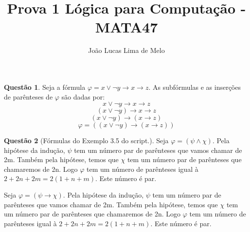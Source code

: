 \documentclass[tikz,border=5]{article}
\title{Prova 1 Lógica para Computação - MATA47}
\author{João Lucas Lima de Melo}
\theoremstyle{definition}
\newtheorem{exerc}{Questão}
\begin{document}
	\maketitle
	\begin{exerc} Seja a fórmula $\varphi = x \vee \neg y \rightarrow x \rightarrow z$. As subfórmulas e as inserções de parênteses de $\varphi$ são dadas por:
	    \begin{displaymath}
	        x \vee \neg y \rightarrow x \rightarrow z
	    \end{displaymath}
	    \begin{displaymath}
	        (x \vee \neg y) \rightarrow x \rightarrow z
	    \end{displaymath}
	    \begin{displaymath}
	        (x \vee \neg y) \rightarrow (x \rightarrow z)
	    \end{displaymath}
	    \begin{displaymath}
	        \varphi = ((x \vee \neg y) \rightarrow (x \rightarrow z))
	    \end{displaymath}
		
	\end{exerc}
	\begin{exerc}[Fórmulas do Exemplo 3.5 do script.]
		Seja $\varphi = (\psi \wedge \chi)$. Pela hipótese da indução, $\psi$ tem um número par de parênteses que vamos chamar de 2m. Também pela hipótese, temos que $\chi$ tem um número par de parênteses que chamaremos de 2n. Logo $\varphi$ tem um número de parênteses igual à $2 + 2n + 2m = 2(1+n+m)$. Este número é par.
		
		Seja $\varphi = (\psi \rightarrow \chi)$. Pela hipótese da indução, $\psi$ tem um número par de parênteses que vamos chamar de 2m. Também pela hipótese, temos que $\chi$ tem um número par de parênteses que chamaremos de 2n. Logo $\varphi$ tem um número de parênteses igual à $2 + 2n + 2m = 2(1+n+m)$. Este número é par.
	\end{exerc}
\end{document}
